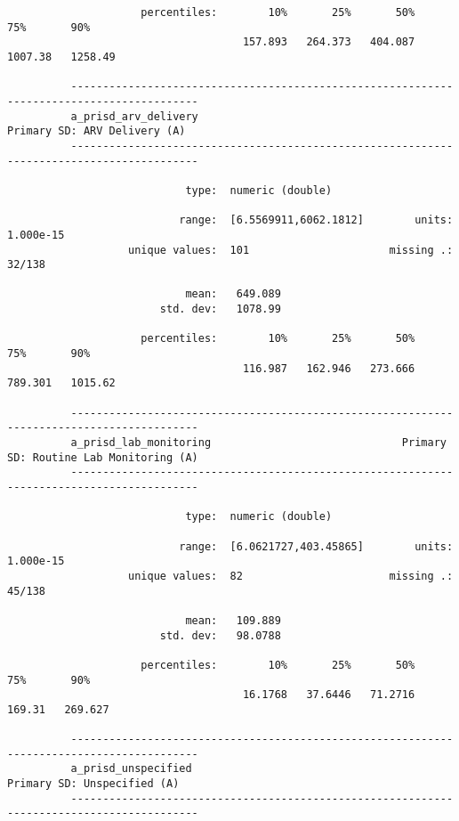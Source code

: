\documentclass{article}
\begin{document}
\begin{verbatim}
                     percentiles:        10%       25%       50%       75%       90%
                                     157.893   264.373   404.087   1007.38   1258.49
          
          ------------------------------------------------------------------------------------------
          a_prisd_arv_delivery                                          Primary SD: ARV Delivery (A)
          ------------------------------------------------------------------------------------------
          
                            type:  numeric (double)
          
                           range:  [6.5569911,6062.1812]        units:  1.000e-15
                   unique values:  101                      missing .:  32/138
          
                            mean:   649.089
                        std. dev:   1078.99
          
                     percentiles:        10%       25%       50%       75%       90%
                                     116.987   162.946   273.666   789.301   1015.62
          
          ------------------------------------------------------------------------------------------
          a_prisd_lab_monitoring                              Primary SD: Routine Lab Monitoring (A)
          ------------------------------------------------------------------------------------------
          
                            type:  numeric (double)
          
                           range:  [6.0621727,403.45865]        units:  1.000e-15
                   unique values:  82                       missing .:  45/138
          
                            mean:   109.889
                        std. dev:   98.0788
          
                     percentiles:        10%       25%       50%       75%       90%
                                     16.1768   37.6446   71.2716    169.31   269.627
          
          ------------------------------------------------------------------------------------------
          a_prisd_unspecified                                            Primary SD: Unspecified (A)
          ------------------------------------------------------------------------------------------
          

\end{verbatim}
\end{document}
